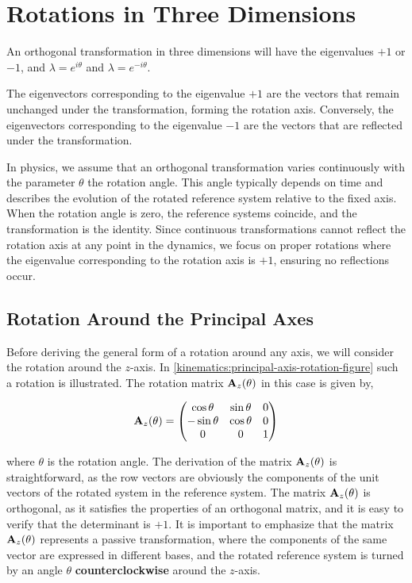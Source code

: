 \documentclass[12pt]{article}
\begin{document}
\section{Rotations in Three Dimensions}

An orthogonal transformation in three dimensions will have the eigenvalues $+1$ or $-1$, and
$\lambda = e^{i\theta}$ and $\lambda = e^{-i\theta}$.

The eigenvectors corresponding to the eigenvalue $+1$ are the vectors that remain unchanged
under the transformation, forming the rotation axis. Conversely, the eigenvectors
corresponding to the eigenvalue $-1$ are the vectors that are reflected under the
transformation.

In physics, we assume that an orthogonal transformation varies continuously with the
parameter $\theta$ the rotation angle. This angle typically depends on time and describes the
evolution of the rotated reference system relative to the fixed axis. When the rotation angle
is zero, the reference systems coincide, and the transformation is the identity. Since
continuous transformations cannot reflect the rotation axis at any point in the dynamics, we
focus on proper rotations where the eigenvalue corresponding to the rotation axis is $+1$,
ensuring no reflections occur.

\subsection{Rotation Around the Principal Axes}

Before deriving the general form of a rotation around any axis, we will consider the rotation
around the $z$-axis. In \eqref{kinematics:principal-axis-rotation-figure} such a rotation is illustrated.
 The rotation matrix $\vb{A}_z(\theta)$ in this case is given by,

\begin{equation}
  \vb{A}_z(\theta) =
  \begin{pmatrix}
    \cos\theta  & \sin\theta & 0 \\
    -\sin\theta & \cos\theta & 0 \\
    0           & 0          & 1
  \end{pmatrix}
\end{equation}

where $\theta$ is the rotation angle. The derivation of the matrix $\vb{A}_z(\theta)$ is
straightforward, as the row vectors are obviously the components of the unit vectors of the
rotated system in the reference system. The matrix $\vb{A}_z(\theta)$ is orthogonal, as it
satisfies the properties of an orthogonal matrix, and it is easy to verify that the
determinant is $+1$. It is important to emphasize that the matrix $\vb{A}_z(\theta)$
represents a passive transformation, where the components of the same vector are expressed
in different bases, and the rotated reference system is turned by an angle $\theta$
\textbf{counterclockwise} around the $z$-axis.
\end{document}

